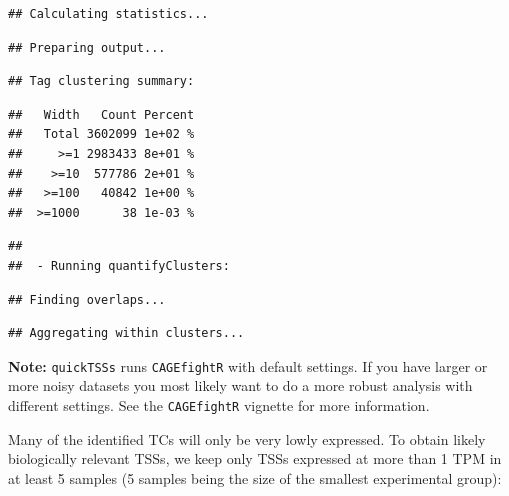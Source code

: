 \documentclass[9pt,a4paper,]{extarticle}
\newenvironment{Shaded}{\begin{snugshade}}{\end{snugshade}}
\newcommand{\KeywordTok}[1]{\textcolor[rgb]{0.13,0.29,0.53}{\textbf{{#1}}}}
\newcommand{\DataTypeTok}[1]{\textcolor[rgb]{0.13,0.29,0.53}{{#1}}}
\newcommand{\DecValTok}[1]{\textcolor[rgb]{0.00,0.00,0.81}{{#1}}}
\newcommand{\StringTok}[1]{\textcolor[rgb]{0.31,0.60,0.02}{{#1}}}
\newcommand{\NormalTok}[1]{{#1}}
\begin{document}
\begin{verbatim}
## Calculating statistics...
\end{verbatim}

\begin{verbatim}
## Preparing output...
\end{verbatim}

\begin{verbatim}
## Tag clustering summary:
\end{verbatim}

\begin{verbatim}
##   Width   Count Percent
##   Total 3602099 1e+02 %
##     >=1 2983433 8e+01 %
##    >=10  577786 2e+01 %
##   >=100   40842 1e+00 %
##  >=1000      38 1e-03 %
\end{verbatim}

\begin{verbatim}
## 
##  - Running quantifyClusters:
\end{verbatim}

\begin{verbatim}
## Finding overlaps...
\end{verbatim}

\begin{verbatim}
## Aggregating within clusters...
\end{verbatim}

\textbf{Note:} \texttt{quickTSSs} runs \texttt{CAGEfightR} with default settings. If you have larger or more noisy datasets you most likely want to do a more robust analysis with different settings. See the \texttt{CAGEfightR} vignette for more information.

Many of the identified TCs will only be very lowly expressed. To obtain likely biologically relevant TSSs, we keep only TSSs expressed at more than 1 TPM in at least 5 samples (5 samples being the size of the smallest experimental group):

\begin{Shaded}
\end{Shaded}
\end{document}
